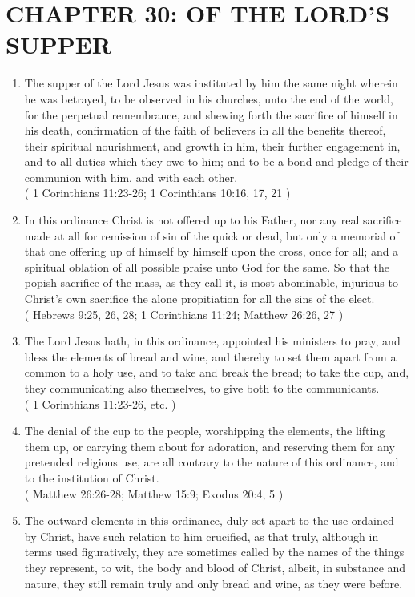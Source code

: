 \documentclass[12pt,a4paper]{book}
\begin{document}
\chapter{CHAPTER 30: OF THE LORD'S SUPPER}
\label{ch-lor-sup}
\begin{enumerate}
\item The supper of the Lord Jesus was instituted by him the same night wherein he was betrayed, to be observed in his churches, unto the end of the world, for the perpetual remembrance, and shewing forth the sacrifice of himself in his death, confirmation of the faith of believers in all the benefits thereof, their spiritual nourishment, and growth in him, their further engagement in, and to all duties which they owe to him; and to be a bond and pledge of their communion with him, and with each other.\\
( 1 Corinthians 11:23-26; 1 Corinthians 10:16, 17, 21 )
\item In this ordinance Christ is not offered up to his Father, nor any real sacrifice made at all for remission of sin of the quick or dead, but only a memorial of that one offering up of himself by himself upon the cross, once for all; and a spiritual oblation of all possible praise unto God for the same. So that the popish sacrifice of the mass, as they call it, is most abominable, injurious to Christ's own sacrifice the alone propitiation for all the sins of the elect.\\
( Hebrews 9:25, 26, 28; 1 Corinthians 11:24; Matthew 26:26, 27 )
\item The Lord Jesus hath, in this ordinance, appointed his ministers to pray, and bless the elements of bread and wine, and thereby to set them apart from a common to a holy use, and to take and break the bread; to take the cup, and, they communicating also themselves, to give both to the communicants.\\
( 1 Corinthians 11:23-26, etc. )
\item The denial of the cup to the people, worshipping the elements, the lifting them up, or carrying them about for adoration, and reserving them for any pretended religious use, are all contrary to the nature of this ordinance, and to the institution of Christ.\\
( Matthew 26:26-28; Matthew 15:9; Exodus 20:4, 5 )
\item The outward elements in this ordinance, duly set apart to the use ordained by Christ, have such relation to him crucified, as that truly, although in terms used figuratively, they are sometimes called by the names of the things they represent, to wit, the body and blood of Christ, albeit, in substance and nature, they still remain truly and only bread and wine, as they were before.\\

\end{enumerate}
\end{document}
